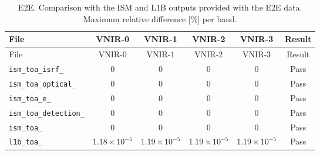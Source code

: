 \begin{longtable}{lccccc}
\caption{E2E. Comparison with the ISM and L1B outputs provided with the E2E data. Maximum relative difference [\%] per band.}\label{tab:e2e_crossval}\\
\toprule
File & VNIR-0 & VNIR-1 & VNIR-2 & VNIR-3 & Result \\
\midrule
\endfirsthead
\toprule
File & VNIR-0 & VNIR-1 & VNIR-2 & VNIR-3 & Result \\
\midrule
\endhead
\texttt{ism\_toa\_isrf\_} & $0$ & $0$ & $0$ & $0$ & Pass \\
\texttt{ism\_toa\_optical\_} & $0$ & $0$ & $0$ & $0$ & Pass \\
\texttt{ism\_toa\_e\_} & $0$ & $0$ & $0$ & $0$ & Pass \\
\texttt{ism\_toa\_detection\_} & $0$ & $0$ & $0$ & $0$ & Pass \\
\texttt{ism\_toa\_} & $0$ & $0$ & $0$ & $0$ & Pass \\
\texttt{l1b\_toa\_} & $1.18\times10^{-5}$ & $1.19\times10^{-5}$ & $1.19\times10^{-5}$ & $1.19\times10^{-5}$ & Pass \\
\bottomrule
\end{longtable}
